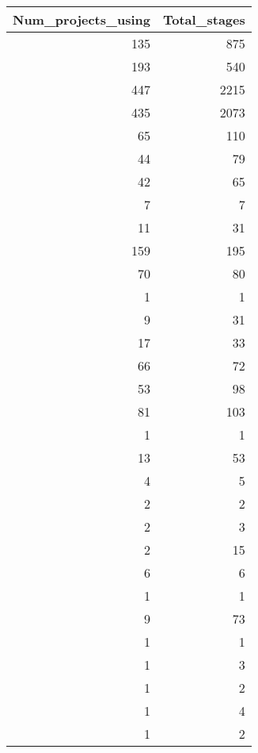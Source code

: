 \begin{tabular}{rr}
\toprule
 Num\_projects\_using &  Total\_stages \\
\midrule
                135 &           875 \\
                193 &           540 \\
                447 &          2215 \\
                435 &          2073 \\
                 65 &           110 \\
                 44 &            79 \\
                 42 &            65 \\
                  7 &             7 \\
                 11 &            31 \\
                159 &           195 \\
                 70 &            80 \\
                  1 &             1 \\
                  9 &            31 \\
                 17 &            33 \\
                 66 &            72 \\
                 53 &            98 \\
                 81 &           103 \\
                  1 &             1 \\
                 13 &            53 \\
                  4 &             5 \\
                  2 &             2 \\
                  2 &             3 \\
                  2 &            15 \\
                  6 &             6 \\
                  1 &             1 \\
                  9 &            73 \\
                  1 &             1 \\
                  1 &             3 \\
                  1 &             2 \\
                  1 &             4 \\
                  1 &             2 \\

\end{tabular}
